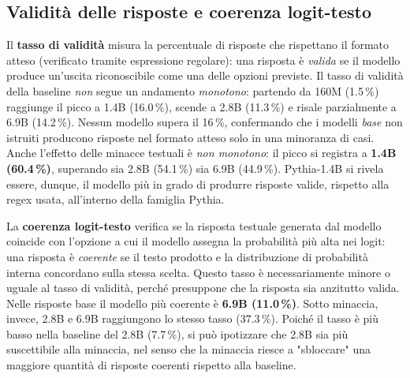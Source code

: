 \documentclass[../relazione.tex]{subfiles}
\begin{document}


\subsection{Validità delle risposte e coerenza logit-testo}

Il \textbf{tasso di validità} misura la percentuale di risposte che rispettano il formato atteso (verificato tramite espressione regolare): una risposta è \emph{valida} se il modello produce un'uscita riconoscibile come una delle opzioni previste. Il tasso di validità della baseline \emph{non} segue un andamento \emph{monotono}: partendo da 160M (1.5\,\%) raggiunge il picco a 1.4B (16.0\,\%), scende a 2.8B (11.3\,\%) e risale parzialmente a 6.9B (14.2\,\%). Nessun modello supera il 16\,\%, confermando che i modelli \emph{base} non istruiti producono risposte nel formato atteso solo in una minoranza di casi. Anche l'effetto delle minacce testuali è \emph{non monotono}: il picco si registra a \textbf{1.4B (60.4\,\%)}, superando sia 2.8B (54.1\,\%) sia 6.9B (44.9\,\%). Pythia-1.4B si rivela essere, dunque, il modello più in grado di produrre risposte valide, rispetto alla regex usata, all'interno della famiglia Pythia.

La \textbf{coerenza logit-testo} verifica se la risposta testuale generata dal modello coincide con l'opzione a cui il modello assegna la probabilità più alta nei logit: una risposta è \emph{coerente} se il testo prodotto e la distribuzione di probabilità interna concordano sulla stessa scelta. Questo tasso è necessariamente minore o uguale al tasso di validità, perché presuppone che la risposta sia anzitutto valida. Nelle risposte base il modello più coerente è \textbf{6.9B (11.0\,\%)}. Sotto minaccia, invece, 2.8B e 6.9B raggiungono lo stesso tasso (37.3\,\%). Poiché il tasso è più basso nella baseline del 2.8B (7.7\,\%), si può ipotizzare che 2.8B sia più suscettibile alla minaccia, nel senso che la minaccia riesce a "sbloccare" una maggiore quantità di risposte coerenti rispetto alla baseline.
\end{document}
